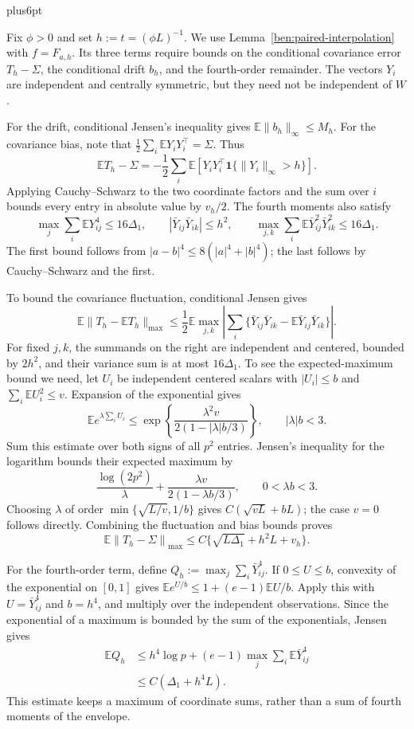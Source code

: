 \documentclass[11pt,letterpaper,twoside,leqno]{article}
\makeatletter
\theoremstyle{bookplain}
\theoremstyle{bookremark}
\renewenvironment{proof}[1][\proofname]{\par
  \pushQED{\qed}\normalfont\topsep6pt plus6pt\relax
  \trivlist\item[\hskip\labelsep\bfseries #1\@addpunct{.}]\ignorespaces
}{\popQED\endtrivlist\@endpefalse}
\newcommand{\E}{\mathbb E}
\newcommand{\norm}[1]{\left\lVert#1\right\rVert}
\newcommand{\maxnorm}[1]{\lVert#1\rVert_{\max}}
\newcommand{\ind}{\mathbf 1}
\makeatother
\begin{document}
\begin{proof}[Proof of Lemma~\ref{ben:comparison}]
Fix $\phi>0$ and set $h:=t=(\phi L)^{-1}$. We use
Lemma~\ref{ben:paired-interpolation} with $f=F_{a,h}$. Its three
terms require bounds on the conditional covariance error
$T_h-\Sigma$, the conditional drift $b_h$, and the fourth-order
remainder. The vectors $Y_i$ are independent and centrally
symmetric, but they need not be independent of $W$.

For the drift, conditional Jensen's inequality gives
$\E\|b_h\|_\infty\le M_h$. For the covariance bias, note that
$\tfrac12\sum_i\E Y_iY_i^\top=\Sigma$. Thus
\[
 \E T_h-\Sigma
 =-\frac12\sum_i\E[Y_iY_i^\top\ind\{\|Y_i\|_\infty>h\}].
\]
Applying Cauchy--Schwarz to the two coordinate factors and the sum
over $i$ bounds every entry in absolute value by $v_h/2$.
The fourth moments also satisfy
\[
 \max_j\sum_i\E Y_{ij}^4\le16\Delta_1,\qquad
 |\bar Y_{ij}\bar Y_{ik}|\le h^2,\qquad
 \max_{j,k}\sum_i\E\bar Y_{ij}^2\bar Y_{ik}^2\le16\Delta_1.
\]
The first bound follows from $|a-b|^4\le8(|a|^4+|b|^4)$;
the last follows by Cauchy--Schwarz and the first.

To bound the covariance fluctuation, conditional Jensen gives
\[
 \E\maxnorm{T_h-\E T_h}
 \le\frac12\E\max_{j,k}\left|
   \sum_i\{\bar Y_{ij}\bar Y_{ik}
                    -\E\bar Y_{ij}\bar Y_{ik}\}\right|.
\]
For fixed $j,k$, the summands on the right are independent and
centered, bounded by $2h^2$, and their variance sum is at most
$16\Delta_1$. To see the expected-maximum bound we need, let
$U_i$ be independent centered scalars with $|U_i|\le b$ and
$\sum_i\E U_i^2\le v$. Expansion of the exponential gives
\[
 \E e^{\lambda\sum_iU_i}
 \le\exp\!\left\{\frac{\lambda^2v}{2(1-|\lambda|b/3)}\right\},
 \qquad |\lambda|b<3.
\]
Sum this estimate over both signs of all $p^2$ entries. Jensen's
inequality for the logarithm bounds their expected maximum by
\[
 \frac{\log(2p^2)}{\lambda}
       +\frac{\lambda v}{2(1-\lambda b/3)},\qquad 0<\lambda b<3.
\]
Choosing $\lambda$ of order
$\min\{\sqrt{L/v},1/b\}$ gives $C(\sqrt{vL}+bL)$;
the case $v=0$ follows directly. Combining the fluctuation and
bias bounds proves
\begin{equation}\label{ben:conditional-matrix}
 \E\norm{T_h-\Sigma}_{\max}
 \le C\{\sqrt{L\Delta_1}+h^2L+v_h\}.
\end{equation}

For the fourth-order term, define
$Q_h:=\max_j\sum_i\bar Y_{ij}^4$.
If $0\le U\le b$, convexity of the exponential on $[0,1]$ gives
$\E e^{U/b}\le1+(e-1)\E U/b$.
Apply this with $U=\bar Y_{ij}^4$ and $b=h^4$, and multiply
over the independent observations. Since the exponential of a
maximum is bounded by the sum of the exponentials, Jensen gives
\begin{equation}\label{ben:fourth-maximum}
 \begin{split}
 \E Q_h
 &\le h^4\log p+(e-1)\max_j\sum_i\E\bar Y_{ij}^4\\
 &\le C(\Delta_1+h^4L).
 \end{split}
\end{equation}
This estimate keeps a maximum of coordinate sums, rather than a
sum of fourth moments of the envelope.


\end{proof}
\end{document}
